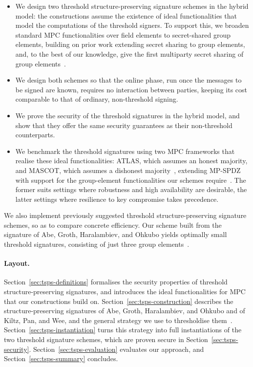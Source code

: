\begin{itemize}

  \item We design two threshold structure-preserving signature schemes in the
    hybrid model: the constructions assume the existence of ideal
    functionalities that model the computations of the threshold signers.
    To support this, we broaden standard MPC functionalities over field
    elements to secret-shared group elements, building on prior work
    extending secret sharing to group elements, and, to the best of our
    knowledge, give the first multiparty secret sharing of group
    elements~\cite{NDSS:GPVRNC23}.

  \item We design both schemes so that the online phase, run once the
    messages to be signed are known, requires no interaction between
    parties, keeping its cost comparable to that of ordinary, non-threshold
    signing.

  \item We prove the security of the threshold signatures in the hybrid
    model, and show that they offer the same security guarantees as their
    non-threshold counterparts.

  \item We benchmark the threshold signatures using two MPC frameworks that
    realise these ideal functionalities: ATLAS, which assumes an honest
    majority, and MASCOT, which assumes a dishonest
    majority~\cite{C:GLOPS21,CCS:KelOrsSch16}, extending MP-SPDZ with support
    for the group-element functionalities our schemes
    require~\cite{CCS:Keller20}. The former suits settings where robustness
    and high availability are desirable, the latter settings where
    resilience to key compromise takes precedence.

\end{itemize}

We also implement previously suggested threshold structure-preserving
signature schemes, so as to compare concrete efficiency. Our scheme built
from the signature of Abe, Groth, Haralambiev, and Ohkubo yields optimally
small threshold signatures, consisting of just three group
elements~\cite{C:AGHO11}.

\paragraph{Layout.} Section~\ref{sec:tsps-definitions} formalises the security
properties of threshold structure-preserving signatures, and introduces the ideal
functionalities for MPC that our constructions build on.
Section~\ref{sec:tsps-construction} describes the structure-preserving signatures of Abe,
Groth, Haralambiev, and Ohkubo and of Kiltz, Pan, and Wee, and the general
strategy we use to thresholdise them~\cite{C:AGHO11,C:KilPanWee15}.
Section~\ref{sec:tsps-instantiation} turns this strategy into full
instantiations of the two threshold signature schemes, which are proven
secure in Section~\ref{sec:tsps-security}. Section~\ref{sec:tsps-evaluation}
evaluates our approach, and Section~\ref{sec:tsps-summary} concludes.
